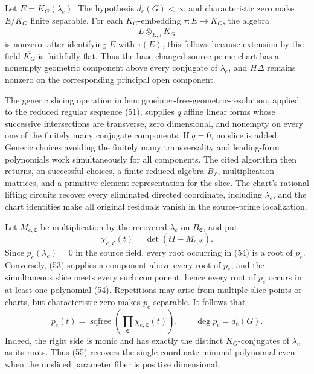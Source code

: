 Let \(E=K_G(\lambda_e)\).  The hypothesis \(d_e(G)<\infty\) and characteristic zero make \(E/K_G\) finite separable.  For each \(K_G\)-embedding \(\tau:E\to\overline{K_G}\), the algebra
\[
 L\otimes_{E,\tau}\overline{K_G}
\tag{53}
\]
is nonzero: after identifying \(E\) with \(\tau(E)\), this follows because extension by the field \(\overline{K_G}\) is faithfully flat.  Thus the base-changed source-prime chart has a nonempty geometric component above every conjugate of \(\lambda_e\), and \(H\Delta\) remains nonzero on the corresponding principal open component.

The generic slicing operation in \(\mathrm{lem:groebner\mbox{-}free\mbox{-}geometric\mbox{-}resolution}\), applied to the reduced regular sequence (51), supplies \(q\) affine linear forms whose successive intersections are transverse, zero dimensional, and nonempty on every one of the finitely many conjugate components.  If \(q=0\), no slice is added.  Generic choices avoiding the finitely many transversality and leading-form polynomials work simultaneously for all components.  The cited algorithm then returns, on successful choices, a finite reduced algebra \(B_{\mathfrak C}\), multiplication matrices, and a primitive-element representation for the slice.  The chart's rational lifting circuits recover every eliminated directed coordinate, including \(\lambda_e\), and the chart identities make all original residuals vanish in the source-prime localization.

Let \(M_{e,\mathfrak C}\) be multiplication by the recovered \(\lambda_e\) on \(B_{\mathfrak C}\), and put
\[
 \chi_{e,\mathfrak C}(t)=\det(tI-M_{e,\mathfrak C}).
\tag{54}
\]
Since \(p_e(\lambda_e)=0\) in the source field, every root occurring in (54) is a root of \(p_e\).  Conversely, (53) supplies a component above every root of \(p_e\), and the simultaneous slice meets every such component; hence every root of \(p_e\) occurs in at least one polynomial (54).  Repetitions may arise from multiple slice points or charts, but characteristic zero makes \(p_e\) separable.  It follows that
\[
 p_e(t)=\operatorname{sqfree}\!\left(
   \prod_{\mathfrak C}\chi_{e,\mathfrak C}(t)
 \right),
 \qquad \deg p_e=d_e(G).
\tag{55}
\]
Indeed, the right side is monic and has exactly the distinct \(K_G\)-conjugates of \(\lambda_e\) as its roots.  Thus (55) recovers the single-coordinate minimal polynomial even when the unsliced parameter fiber is positive dimensional.

